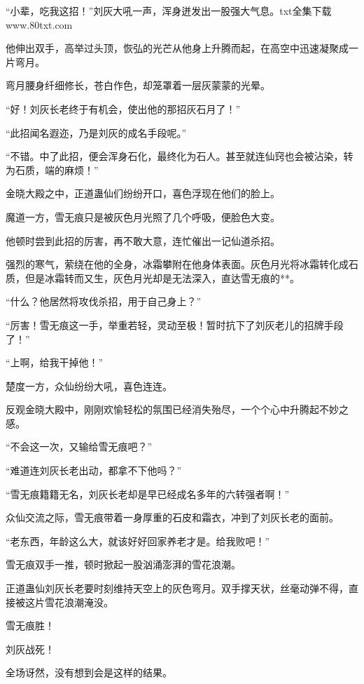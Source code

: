 
\begin{this_body}

“小辈，吃我这招！”刘灰大吼一声，浑身迸发出一股强大气息。txt全集下载www.80txt.com

他伸出双手，高举过头顶，恢弘的光芒从他身上升腾而起，在高空中迅速凝聚成一片弯月。

弯月腰身纤细修长，苍白作色，却笼罩着一层灰蒙蒙的光晕。

“好！刘灰长老终于有机会，使出他的那招灰石月了！”

“此招闻名遐迩，乃是刘灰的成名手段呢。”

“不错。中了此招，便会浑身石化，最终化为石人。甚至就连仙窍也会被沾染，转为石质，端的麻烦！”

金晓大殿之中，正道蛊仙们纷纷开口，喜色浮现在他们的脸上。

魔道一方，雪无痕只是被灰色月光照了几个呼吸，便脸色大变。

他顿时尝到此招的厉害，再不敢大意，连忙催出一记仙道杀招。

强烈的寒气，萦绕在他的全身，冰霜攀附在他身体表面。灰色月光将冰霜转化成石质，但是冰霜转而又生，灰色月光却是无法深入，直达雪无痕的**。

“什么？他居然将攻伐杀招，用于自己身上？”

“厉害！雪无痕这一手，举重若轻，灵动至极！暂时抗下了刘灰老儿的招牌手段了！”

“上啊，给我干掉他！”

楚度一方，众仙纷纷大吼，喜色连连。

反观金晓大殿中，刚刚欢愉轻松的氛围已经消失殆尽，一个个心中升腾起不妙之感。

“不会这一次，又输给雪无痕吧？”

“难道连刘灰长老出动，都拿不下他吗？”

“雪无痕籍籍无名，刘灰长老却是早已经成名多年的六转强者啊！”

众仙交流之际，雪无痕带着一身厚重的石皮和霜衣，冲到了刘灰长老的面前。

“老东西，年龄这么大，就该好好回家养老才是。给我败吧！”

雪无痕双手一推，顿时掀起一股汹涌澎湃的雪花浪潮。

正道蛊仙刘灰长老要时刻维持天空上的灰色弯月。双手撑天状，丝毫动弹不得，直接被这片雪花浪潮淹没。

雪无痕胜！

刘灰战死！

全场讶然，没有想到会是这样的结果。


\end{this_body}
